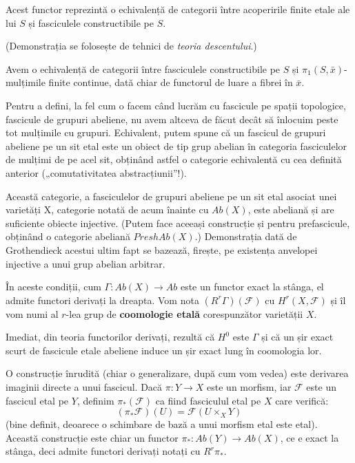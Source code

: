 \documentclass[13pt,openany]{book}
\begin{document}
\begin{teo}
Acest functor reprezintă o echivalență de categorii între acoperirile finite etale ale lui $S$ și fasciculele constructibile pe $S$.
\end{teo}

(Demonstrația se folosește de tehnici de {\it teoria descentului}.)

\begin{cor}
Avem o echivalență de categorii între fasciculele constructibile pe $S$ și $\pi_1(S,\bar{x})$-mulțimile finite continue, dată chiar de functorul de luare a fibrei în $\bar{x}$.
\end{cor}

Pentru a defini, la fel cum o facem când lucrăm cu fascicule pe spații topologice, fascicule de grupuri abeliene, nu avem altceva de făcut decât să înlocuim peste tot mulțimile cu grupuri. Echivalent, putem spune că un fascicul de grupuri abeliene pe un sit etal este un obiect de tip grup abelian în categoria fasciculelor de mulțimi de pe acel sit, obținând astfel o categorie echivalentă cu cea definită anterior („comutativitatea abstracțiunii”!).

Această categorie, a fasciculelor de grupuri abeliene pe un sit etal asociat unei varietăți X, categorie notată de acum înainte cu $Ab(X)$, este abeliană și are suficiente obiecte injective. (Putem face aceeași construcție și pentru prefascicule, obținând o categorie abeliană $PreshAb(X)$.) Demonstrația dată de Grothendieck acestui ultim fapt se bazează, firește, pe existența anvelopei injective a unui grup abelian arbitrar.

În aceste condiții, cum $\Gamma: Ab(X) \rightarrow Ab$ este un functor exact la stânga, el admite functori derivați la dreapta. Vom nota $(R^r\Gamma)(\mathcal{F})$ cu $H^r(X,\mathcal{F})$ și îl vom numi al $r$-lea grup de {\bf coomologie etală} corespunzător varietății $X$.

Imediat, din teoria functorilor derivați, rezultă că $H^0$ este $\Gamma$ și că un șir exact scurt de fascicule etale abeliene induce un șir exact lung în coomologia lor.

O construcție înrudită (chiar o generalizare, după cum vom vedea) este derivarea imaginii directe a unui fascicul. Dacă $\pi: Y \rightarrow X$ este un morfism, iar $\mathcal{F}$ este un fascicul etal pe $Y$, definim $\pi_*(\mathcal{F})$ ca fiind fasciculul etal pe $X$ care verifică:
$$(\pi_*\mathcal{F})(U)=\mathcal{F}(U\times_X Y)$$
(bine definit, deoarece o schimbare de bază a unui morfism etal este etal). Această construcție este chiar un functor $\pi_*: Ab(Y) \rightarrow Ab(X)$, ce e exact la stânga, deci admite functori derivați notați cu $R^r\pi_*$.
\end{document}
